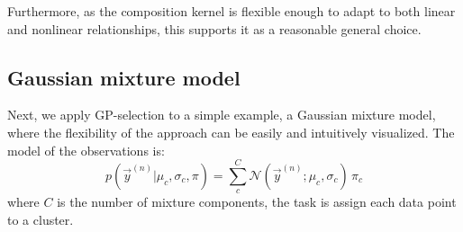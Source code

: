 
Furthermore, as the composition kernel is flexible enough to adapt to both linear and nonlinear relationships, this supports it as a reasonable general choice.


\subsection{Gaussian mixture model}
%
Next, we apply GP-selection to a simple example, a Gaussian mixture model, where the flexibility of the approach can be easily and intuitively visualized.
The model of the observations is:
%
\vspace{-.2cm}
\begin{equation}\label{eq:mog}
p(\vec{y}^{(n)} | \mu_c, \sigma_c, \pi) = \sum_c^{C} \mathcal{N}(\vec{y}^{(n)}; \mu_c, \sigma_c) \, \pi_c
\end{equation}
%
where $C$ is the number of mixture components, the task is assign each data point to a cluster.
%

